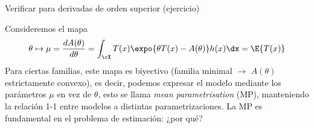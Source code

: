 \begin{example}
Verificar para derivadas de orden superior (ejercicio)
\end{example}


\begin{remark}
Consideremos el mapa
\begin{equation}
    \theta \mapsto \mu = \frac{dA(\theta)}{d\theta} = \int_\cX T (x) \expo{\theta T (x) -A(\theta)}h(x)\dx =\E{T(x)}
\end{equation}
Para ciertas familias, este mapa es biyectivo (familia minimal $\rightarrow$ $A(\theta)$ estrictamente convexo), es decir, podemos expresar el modelo mediante los parámetros $\mu$ en vez de $\theta$, esto se llama \emph{mean parametrisation} (MP), manteniendo la relación 1-1 entre modelos a distintas parametrizaciones. La MP es fundamental en el problema de estimación: ¿por qué?

\end{remark}
